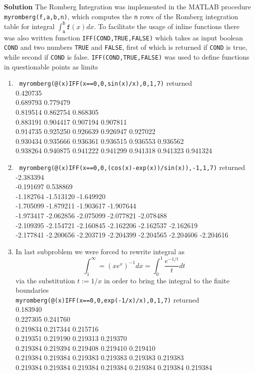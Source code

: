 \documentclass[8pt]{article} %
\newenvironment{solution}%
{\par\textbf{Solution}\space }%
{\par}
\begin{document}
\begin{solution}
	The Romberg Integration was implemented in the MATLAB procedure \texttt{myromberg(f,a,b,n)}, which computes the \texttt{n} rows of the 
	Romberg integration table for integral $\int_\mathtt{a}^\mathtt{b} \mathtt{f}(x)dx$. To facilitate the usage of inline functions there
	was also written function \texttt{IFF(COND,TRUE,FALSE)} which takes as input boolean \texttt{COND} and two numbers \texttt{TRUE} and
	\texttt{FALSE}, first of which is returned if \texttt{COND} is true, while second if \texttt{COND} is false. \texttt{IFF(COND,TRUE,FALSE)}
	was used to define functions in questionable points as limits
	\begin{enumerate}[label=(\alph*)]
		\item{\texttt{ myromberg(@(x)IFF(x==0,0,sin(x)/x),0,1,7)} returned\\
			0.420735\\
			0.689793 0.779479\\
			0.819514 0.862754 0.868305\\
			0.883191 0.904417 0.907194 0.907811\\
			0.914735 0.925250 0.926639 0.926947 0.927022\\
			0.930434 0.935666 0.936361 0.936515 0.936553 0.936562\\
			0.938264 0.940875 0.941222 0.941299 0.941318 0.941323 0.941324\\
			}
		\item{\texttt{ myromberg(@(x)IFF(x==0,0,(cos(x)-exp(x))/sin(x)),-1,1,7)} returned\\
			-2.383394\\
			-0.191697 0.538869\\
			-1.182764 -1.513120 -1.649920\\
			-1.705099 -1.879211 -1.903617 -1.907644\\
			-1.973417 -2.062856 -2.075099 -2.077821 -2.078488\\
			-2.109395 -2.154721 -2.160845 -2.162206 -2.162537 -2.162619\\
			-2.177841 -2.200656 -2.203719 -2.204399 -2.204565 -2.204606 -2.204616\\
			}
		\item{In last subproblem we were forced to rewrite integral as
			\[\int_1^\infty=(xe^x)^{-1}dx=\int_0^1 \frac{e^{-1/t}}{t}dt\]
			via the substitution $t:=1/x$ in order to bring the integral to the finite boundaries\\
			\texttt{myromberg(@(x)IFF(x==0,0,exp(-1/x)/x),0,1,7)} returned\\
			0.183940\\
			0.227305 0.241760\\
			0.219834 0.217344 0.215716\\
			0.219351 0.219190 0.219313 0.219370\\
			0.219384 0.219394 0.219408 0.219410 0.219410\\
			0.219384 0.219384 0.219383 0.219383 0.219383 0.219383\\
			0.219384 0.219384 0.219384 0.219384 0.219384 0.219384 0.219384\\
			}
	\end{enumerate}
\end{solution}
\end{document}
